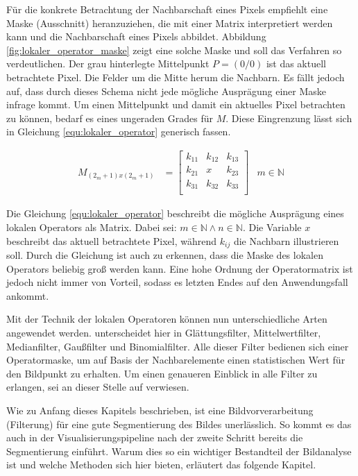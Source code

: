 Für die konkrete Betrachtung der Nachbarschaft eines Pixels empfiehlt \citet[S.~52]{handels2000}
eine Maske (Ausschnitt) heranzuziehen, die mit einer Matrix interpretiert werden
kann und die Nachbarschaft eines Pixels abbildet. Abbildung
\ref{fig:lokaler_operator_maske} zeigt eine solche Maske und soll das Verfahren
so verdeutlichen. Der grau hinterlegte Mittelpunkt $P = (0/0)$ ist das aktuell betrachtete
Pixel. Die Felder um die Mitte herum die Nachbarn. Es fällt jedoch auf, dass
durch dieses Schema nicht jede mögliche Ausprägung einer Maske infrage kommt. Um
einen Mittelpunkt und damit ein aktuelles Pixel betrachten zu können, bedarf es
eines ungeraden Grades für $M$. Diese Eingrenzung lässt sich in Gleichung \ref{equ:lokaler_operator}
generisch fassen.

\begin{align}
	\label{equ:lokaler_operator}M_{(2_m+1)x(2_m+1)} & = \begin{bmatrix}k_{11}&k_{12}&k_{13}\\ k_{21}&x&k_{23}\\ k_{31}&k_{32}&k_{33}\\\end{bmatrix} & m \in \mathbb{N}
\end{align}

Die Gleichung \ref{equ:lokaler_operator} beschreibt die mögliche Ausprägung
eines lokalen Operators als Matrix. Dabei sei:
$m \in \mathbb{N}\wedge n \in \mathbb{N}$. Die Variable $x$ beschreibt das aktuell
betrachtete Pixel, während $k_{ij}$ die Nachbarn illustrieren soll. Durch die Gleichung
ist auch zu erkennen, dass die Maske des lokalen Operators beliebig groß werden
kann. Eine hohe Ordnung der Operatormatrix ist jedoch nicht immer von Vorteil,
sodass es letzten Endes auf den Anwendungsfall ankommt.

Mit der Technik der lokalen Operatoren können nun unterschiedliche Arten
angewendet werden. \citet[S.~54 - 55]{handels2000} unterscheidet hier in
Glättungsfilter, Mittelwertfilter, Medianfilter, Gaußfilter und Binomialfilter.
Alle dieser Filter bedienen sich einer Operatormaske, um auf Basis der Nachbarelemente
einen statistischen Wert für den Bildpunkt zu erhalten. Um einen genaueren
Einblick in alle Filter zu erlangen, sei an dieser Stelle auf \citet[S.~54 - 55]{handels2000}
verwiesen.

Wie zu Anfang dieses Kapitels beschrieben, ist eine Bildvorverarbeitung (Filterung)
für eine gute Segmentierung des Bildes unerlässlich. So kommt es das auch in der
Visualisierungspipeline nach \citet[S.~50]{handels2000} der zweite Schritt bereits
die Segmentierung einführt. Warum dies so ein wichtiger Bestandteil der
Bildanalyse ist und welche Methoden sich hier bieten, erläutert das folgende Kapitel.

